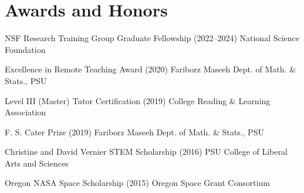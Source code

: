 \section{Awards and Honors}

\cvline
{NSF Research Training Group Graduate Fellowship (2022--2024)}
{National Science Foundation}

\cvline
{Excellence in Remote Teaching Award (2020)}
{Fariborz Maseeh Dept. of Math. \& Stats., PSU}

\cvline
{Level III (Master) Tutor Certification (2019)}
{College Reading \& Learning Association}

\cvline
{F. S. Cater Prize (2019)}
{Fariborz Maseeh Dept. of Math. \& Stats., PSU}

\cvline
{Christine and David Vernier STEM Scholarship (2016)}
{PSU College of Liberal Arts and Sciences}

\cvline
{Oregon NASA Space Scholarship (2015)}
{Oregon Space Grant Consortium}
